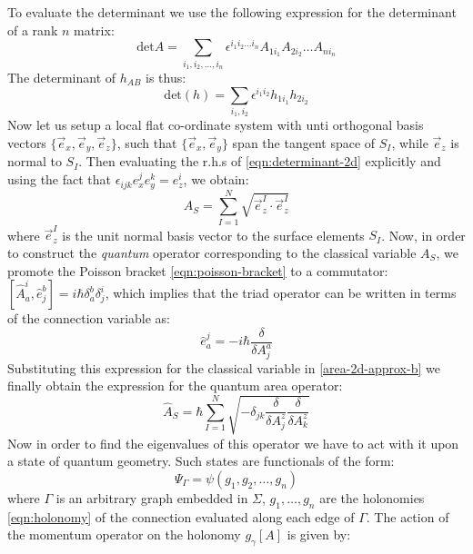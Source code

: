 \documentclass[11pt,a4paper,nofootinbib]{revtex4-1}
\begin{document}
To evaluate the determinant we use the following expression for the determinant of a rank $ n $ matrix:
\begin{equation}\label{eqn:determinant}
	\text{det} A = \sum_{i_1, i_2, \ldots,i_n} \epsilon^{i_1 i_2 \ldots i_n} A_{1 i_1} A_{2 i_2}\ldots A_{n i_n}
\end{equation}
The determinant of $ h_{AB} $ is thus:
\begin{equation}\label{eqn:determinant-2d}
	\text{det} (h) = \sum_{i_1,i_2} \epsilon^{i_1 i_2} h_{1 i_1} h_{2 i_2}
\end{equation}
Now let us setup a local flat co-ordinate system with unti orthogonal basis vectors $ \{\vec{e}_x, \vec{e}_y, \vec{e}_z\} $, such that $ \{ \vec{e}_x, \vec{e}_y \} $ span the tangent space of $ S_I $, while $ \vec{e}_z $ is normal to $ S_I $. Then evaluating the r.h.s of \eqref{eqn:determinant-2d} explicitly and using the fact that $ \epsilon_{ijk} e_x^j e_y^k = e_z^i $, we obtain:
\begin{equation}\label{area-2d-approx-b}
	A_S = \sum_{I=1}^N \sqrt{\vec{e}^I_z \cdot \vec{e}^I_z}
\end{equation}
where $ \vec{e}^I_z $ is the unit normal basis vector to the surface elements $ S_I $. Now, in order to construct the \emph{quantum} operator corresponding to the classical variable $ A_S $, we promote the Poisson bracket \eqref{eqn:poisson-bracket} to a commutator: $ [ \hat A_a^i, \hat e^b_j ] = i \hbar\delta^b_a \delta^i_j $, which implies that the triad operator can be written in terms of the connection variable as:
\begin{equation}\label{eqn:triad-operator}
	\hat e_a^j = -i\hbar \frac{\delta}{\delta A^a_j}
\end{equation}
Substituting this expression for the classical variable in \eqref{area-2d-approx-b} we finally obtain the expression for the quantum area operator:
\begin{equation}\label{eqn:area-quantum}
	\hat A_S = \hbar \sum_{I=1}^N \sqrt{ - \delta_{jk} \frac{\delta}{\delta A^z_j} \frac{\delta}{\delta A^z_k}} 
\end{equation}
Now in order to find the eigenvalues of this operator we have to act with it upon a state of quantum geometry. Such states are functionals of the form:
\begin{equation}\label{eqn:graph-state}
	\Psi_\Gamma = \psi(g_1,g_2,\ldots,g_n)
\end{equation}
where $ \Gamma $ is an arbitrary graph embedded in $ \Sigma $, $ g_1,\ldots,g_n $ are the holonomies \eqref{eqn:holonomy} of the connection evaluated along each edge of $ \Gamma $. The action of the momentum operator on the holonomy $ g_\gamma[A] $ is given by:
\end{document}
